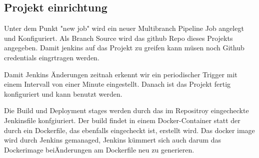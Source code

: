 \subsection{Projekt einrichtung}

Unter dem Punkt "new job" wird ein neuer Multibranch Pipeline Job angelegt und Konfiguriert. Als Branch Source wird das github Repo dieses Projekts angegeben. Damit jenkins auf das Projekt zu greifen kann müsen noch Github credentials eingrtragen werden. 

Damit Jenkins Änderungen zeitnah erkennt wir ein periodischer Trigger mit einem Intervall von einer Minute eingestellt. Danach ist das Projekt fertig konfiguriert und kann benutzt werden.

Die Build und Deployment stages werden durch das im Repositroy eingecheckte Jenkinsfile konfgiuriert. Der build findet in einem Docker-Container statt der durch ein Dockerfile, das ebenfalls eingecheckt ist, erstellt wird. Das docker image wird durch Jenkins gemanaged, Jenkins kümmert sich auch darum das Dockerimage beiÄnderungen am Dockerfile neu zu generieren.
